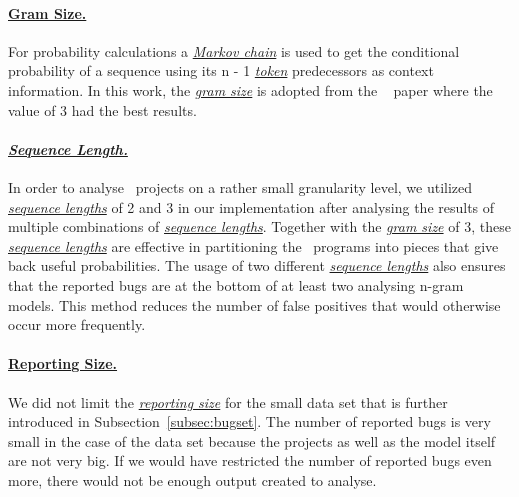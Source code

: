 \paragraph{\hyperref[def:gram_size]{Gram Size.}}
For probability calculations a \hyperref[def:markov_chain]{\textit{Markov chain}} is used to get the conditional probability of a sequence using its n - 1 \hyperref[def:token]{\textit{token}} predecessors as context information. In this work, the \hyperref[def:gram_size]{\textit{gram size}} is adopted from the \bugram{}~\cite{bugram} paper where the value of 3 had the best results. 

\paragraph{\hyperref[def:sequence_length]{\textit{Sequence Length.}}}
In order to analyse \scratch\ projects on a rather small granularity level, we utilized \hyperref[def:sequence_length]{\textit{sequence lengths}} of 2 and 3 in our implementation after analysing the results of multiple combinations of \hyperref[def:sequence_length]{\textit{sequence lengths}}. Together with the \hyperref[def:gram_size]{\textit{gram size}} of 3, these \hyperref[def:sequence_length]{\textit{sequence lengths}} are effective in partitioning the \scratch\ programs into pieces that give back useful probabilities. The usage of two different \hyperref[def:sequence_length]{\textit{sequence lengths}} also ensures that the reported bugs are at the bottom of at least two analysing n-gram models. This method reduces the number of false positives that would otherwise occur more frequently.

\paragraph{\hyperref[def:reporting_size]{Reporting Size.}}
We did not limit the \hyperref[def:reporting_size]{\textit{reporting size}} for the small data set that is further introduced in Subsection~\ref{subsec:bugset}. The number of reported bugs is very small in the case of the data set because the projects as well as the model itself are not very big. If we would have restricted the number of reported bugs even more, there would not be enough output created to analyse.  

